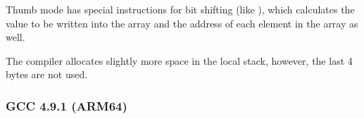 Thumb mode has special instructions for bit shifting (like ),
which calculates the value to be written into the array and the address of each element in the array as well.

The compiler allocates slightly more space in the local stack, however, the last 4 bytes are not used.

\subsubsection{\NonOptimizing GCC 4.9.1 (ARM64)}



